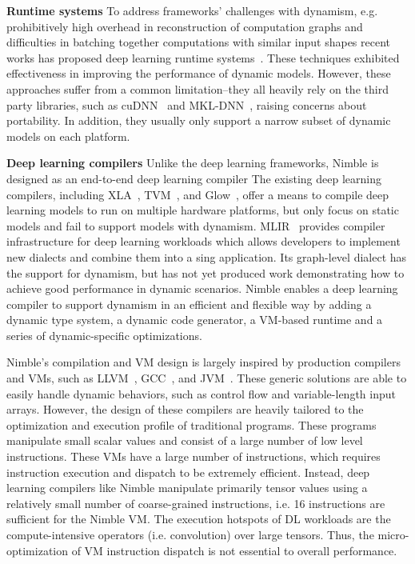 \noindent
{\bf Runtime systems} To address frameworks' challenges with dynamism, e.g. prohibitively high overhead in reconstruction of computation graphs and difficulties in batching together computations with similar input shapes recent works has proposed deep learning runtime systems~\citep{xu2018cavs, gao2018low}. These techniques exhibited effectiveness in improving the performance of dynamic models. However, these approaches suffer from a common limitation--they all heavily rely on the third party libraries, such as cuDNN~\citep{cudnn} and MKL-DNN~\citep{mkldnn}, raising concerns about portability. In addition, they usually only support a narrow subset of dynamic models on each platform.

\noindent
{\bf Deep learning compilers} Unlike the deep learning frameworks, Nimble is designed as an end-to-end deep learning compiler The existing deep learning compilers, including XLA~\citep{xla}, TVM~\citep{tvm_osdi18}, and Glow~\citep{glow}, offer a means to compile deep learning models to run on multiple hardware platforms, but only focus on static models and fail to support models with dynamism.
MLIR~\citep{lattner2020mlir} provides compiler infrastructure for deep learning workloads which allows developers to implement new dialects and combine them into a sing application. Its graph-level dialect has the support for dynamism, but has not yet produced work demonstrating how to achieve good performance in dynamic scenarios.
Nimble enables a deep learning compiler to support dynamism in an efficient and flexible way by adding a dynamic type system, a dynamic code generator, a VM-based runtime and a series of dynamic-specific optimizations.

Nimble's compilation and VM design is largely inspired by production compilers and VMs, such as LLVM~\citep{llvm}, GCC~\citep{gcc}, and JVM~\citep{jvm}. These generic solutions are able to easily handle dynamic behaviors, such as control flow and variable-length input arrays. However, the design of these compilers are heavily tailored to the optimization and execution profile of traditional programs. These programs manipulate small scalar values and consist of a large number of low level instructions. These VMs have a large number of instructions, which requires instruction execution and dispatch to be extremely efficient. Instead, deep learning compilers like Nimble manipulate primarily tensor values using a relatively small number of coarse-grained instructions, i.e. 16 instructions are sufficient for the Nimble VM. The execution hotspots of DL workloads are the compute-intensive operators (i.e. convolution) over large tensors. Thus, the micro-optimization of VM instruction dispatch is not essential to overall performance.

\vspace{-1.5em}
